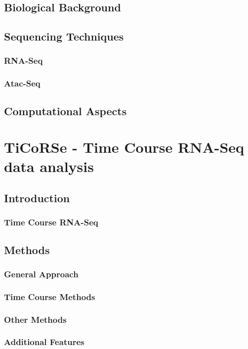 \documentclass[b5paper,oneside,british,intoc,bibliograph=totoc,index=totoc,BCOR10mm,twoside,openright]{book}
\numberwithin{equation}{section}
\numberwithin{figure}{section}
\begin{document}
\section{Biological Background}


\section{Sequencing Techniques}
\subsection{RNA-Seq} \label{sec:rnaseq}

\subsection{Atac-Seq} \label{sec:atacseq}


\section{Computational Aspects}


\chapter{TiCoRSe - Time Course RNA-Seq data analysis}
\section{Introduction}
\subsection{Time Course RNA-Seq}
\section{Methods}
\subsection{General Approach}
\subsection{Time Course Methods}
\subsection{Other Methods}
\subsection{Additional Features}
\end{document}
